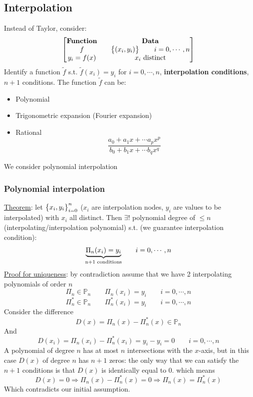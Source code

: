 \subsection{Interpolation}
    Instead of Taylor, consider:
    $$
    \begin{bmatrix}
        \text{\textbf{Function}} & & \text{\textbf{Data}}\\
        f & & \Brackets{(x_i,y_i)} \qquad i=0,\cdots,n\\
        y_i=f(x) & & x_i\text{ distinct}
    \end{bmatrix}
    $$
    Identify a function $\tilde{f}$ s.t. $\tilde{f}(x_i)=y_i$ for $i=0,\cdots,n$, \textbf{interpolation conditions}, $n+1$ conditions. The function $\tilde{f}$ can be:
    \begin{itemize}
        \item Polynomial
        \item Trigonometric expansion (Fourier expansion)
        \item Rational
        $$
        \frac{
            a_0+a_1x+\cdots a_px^p
        }{
            b_0+b_1x+\cdots b_qx^q
        }
        $$
    \end{itemize}
    We consider polynomial interpolation

    \subsubsection{Polynomial interpolation}
    \underline{Theorem}: let $\Brackets{x_i,y_i}^n_{i=0}$ ($x_i$ are interpolation nodes, $y_i$ are values to be interpolated) with $x_i$ all distinct. Then $\exists !$ polynomial degree of $\leq n$ (interpolating/interpolation polynomial) s.t. (we guarantee interpolation condition):
    $$
    \underlabel{
        \Pi_n(x_i)=y_i
    }{n+1 conditions}
    \qquad i=0,\cdots,n
    $$
    \underline{Proof for uniqueness}: by contradiction assume that we have 2 interpolating polynomials of order $n$
    $$
    \Pi_n\in\mathbb{P}_n\qquad \Pi_n(x_i)=y_i\qquad i=0,\cdots,n
    $$
    $$
    \Pi_n^*\in\mathbb{P}_n\qquad \Pi_n^*(x_i)=y_i\qquad i=0,\cdots,n
    $$
    Consider the difference
    $$
    D(x)=\Pi_n(x)-\Pi_n^*(x)\in\mathbb{P}_n
    $$
    And
    $$
    D(x_i)=\Pi_n(x_i)-\Pi_n^*(x_i)=y_i-y_i=0\qquad i=0,\cdots,n
    $$
    A polynomial of degree $n$ has at most $n$ intersections with the $x$-axis, but in this case $D(x)$ of degree $n$ has $n+1$ zeros: the only way that we can satisfy the $n+1$ conditions is that $D(x)$ is identically equal to 0. which means
    $$
    D(x)=0\Rightarrow
    \Pi_n(x)-\Pi_n^*(x)=0\Rightarrow
    \Pi_n(x)=\Pi_n^*(x)
    $$
    Which contradicts our initial assumption.

